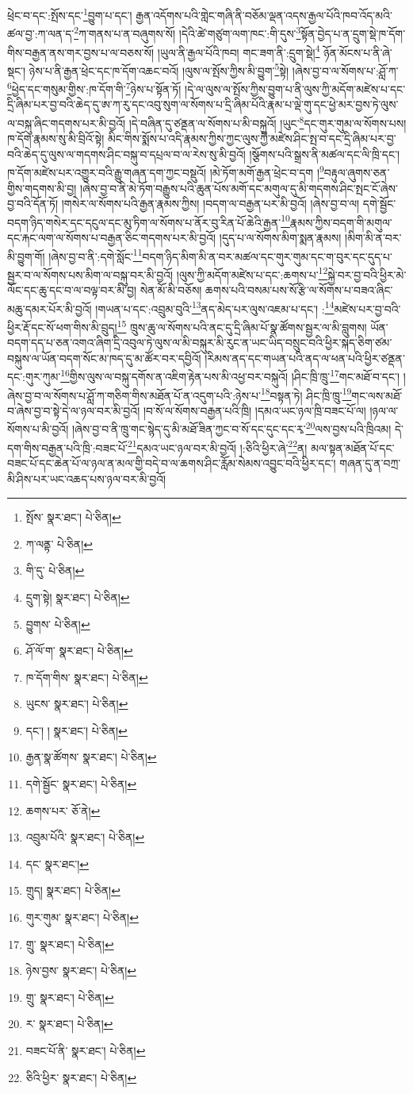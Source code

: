 ཕྲེང་བ་དང་:སྤོས་དང་\footnote{སྤོས་  སྣར་ཐང་།  པེ་ཅིན། }བྱུག་པ་དང་། རྒྱན་འདོགས་པའི་གླེང་གཞི་ནི་བཅོམ་ལྡན་འདས་རྒྱལ་པོའི་ཁབ་འོད་མའི་ཚལ་བྱ་:ཀ་ལན་ད་\footnote{ཀ་ལནྟ་  པེ་ཅིན། }ཀ་གནས་པ་ན་བཞུགས་སོ། །དེའི་ཚེ་གཙུག་ལག་ཁང་:གི་དུས་\footnote{གི་དུ་  པེ་ཅིན། }སྟོན་བྱེད་པ་ན་དྲུག་སྡེ་ཁ་དོག་གིས་བརྒྱན་ནས་གར་བྱས་པ་ལ་བཅས་སོ། །ཡུལ་ནི་རྒྱལ་པོའི་ཁབ། གང་ཟག་ནི་:དྲུག་སྡེ།\footnote{དྲུག་སྟེ།  སྣར་ཐང་།  པེ་ཅིན། } ཉོན་མོངས་པ་ནི་ཞེ་སྡང་། ཉེས་པ་ནི་རྒྱན་ཕྲེང་དང་ཁ་དོག་འཆང་བའོ། །ལུས་ལ་སྤོས་ཀྱིས་མི་བྱུག་\footnote{བྱུགས་  པེ་ཅིན། }སྟེ། །ཞེས་བྱ་བ་ལ་སོགས་པ་:ཤློ་ཀ་\footnote{ཤོ་ལོ་ག་  སྣར་ཐང་།  པེ་ཅིན། }ཕྱེད་དང་གསུམ་གྱིས་:ཁ་དོག་གི་\footnote{ཁ་དོག་གིས་  སྣར་ཐང་།  པེ་ཅིན། }ཉེས་པ་སྟོན་ཏོ། །དེ་ལ་ལུས་ལ་སྤོས་ཀྱིས་བྱུག་པ་ནི་ལུས་ཀྱི་མདོག་མཛེས་པ་དང་དྲི་ཞིམ་པར་བྱ་བའི་ཆེད་དུ་ཨ་ཀ་རུ་དང་འབུ་སུག་ལ་སོགས་པ་དྲི་ཞིམ་པོའི་རྣམ་པ་ལྡེ་གུ་དང་ཕྱེ་མར་བྱས་ཏེ་ལུས་ལ་བསྐུ་ཞིང་གདགས་པར་མི་བྱའོ། །དེ་བཞིན་དུ་ཙནྡན་ལ་སོགས་པ་མི་བསྐུའོ། །ཡུང་\footnote{ཡུངས་  སྣར་ཐང་།  པེ་ཅིན། }དང་གུར་གུམ་ལ་སོགས་པས། ཁ་དོག་རྣམས་སུ་མི་བྲིའོ་སྟེ། མིང་གིས་སྨོས་པ་འདི་རྣམས་ཀྱིས་ཀྱང་ལུས་ཀྱི་མཛེས་ཤིང་སྤ་བ་དང་དྲི་ཞིམ་པར་བྱ་བའི་ཆེད་དུ་ལུས་ལ་གདགས་ཤིང་བསྐུ་བ་དཔྲལ་བ་ལ་རེས་སུ་མི་བྱའོ། །སྩོགས་པའི་སྒྲས་ནི་མཚལ་དང་ལི་ཁྲི་དང་། ཁ་དོག་མཛེས་པར་འགྱུར་བའི་རྒྱུ་གཞན་དག་ཀྱང་བསྡུའོ། །མེ་ཏོག་མགོ་རྒྱན་ཕྲེང་བ་དག །\footnote{དང་། །  སྣར་ཐང་།  པེ་ཅིན། }བརྟུལ་ཞུགས་ཅན་གྱིས་གདགས་མི་བྱ། །ཞེས་བྱ་བ་ནི་མེ་ཏོག་བརྒྱུས་པའི་ཆུན་པོས་མགོ་དང་མགུལ་དུ་མི་གདགས་ཤིང་སྤང་ངོ་ཞེས་བྱ་བའི་དོན་ཏོ། །གསེར་ལ་སོགས་པའི་རྒྱན་རྣམས་ཀྱིས། །བདག་ལ་བརྒྱན་པར་མི་བྱའོ། །ཞེས་བྱ་བ་ལ། དགེ་སྦྱོང་བདག་ཉིད་གསེར་དང་དངུལ་དང་མུ་ཏིག་ལ་སོགས་པ་ནོར་བུ་རིན་པོ་ཆེའི་རྒྱན་\footnote{རྒྱན་སྣ་ཚོགས་  སྣར་ཐང་།  པེ་ཅིན། }རྣམས་ཀྱིས་བདག་གི་མགུལ་དང་རྐང་ལག་ལ་སོགས་པ་བརྒྱན་ཅིང་གདགས་པར་མི་བྱའོ། །དུད་པ་ལ་སོགས་མིག་སྨན་རྣམས། །མིག་མི་ན་བར་མི་བྱུག་གོ། །ཞེས་བྱ་བ་ནི་:དགེ་སློང་\footnote{དགེ་སྦྱོང་  སྣར་ཐང་།  པེ་ཅིན། }བདག་ཉིད་མིག་མི་ན་བར་མཚལ་དང་གུར་གུམ་དང་ག་བུར་དང་དུད་པ་སྦྱར་བ་ལ་སོགས་པས་མིག་ལ་བསྐུ་བར་མི་བྱའོ། །ལུས་ཀྱི་མདོག་མཛེས་པ་དང་:ཆགས་པ་\footnote{ཆགས་པར་  ཅོ་ནེ། }སྐྱེ་བར་བྱ་བའི་ཕྱིར་མེ་ལོང་དང་ཆུ་དང་བ་ལ་བལྟ་བར་མི་བྱ། སེན་མོ་མི་བཅོས། ཆགས་པའི་བསམ་པས་སོ་རྩི་ལ་སོགས་པ་བཟའ་ཞིང་མཆུ་དམར་པོར་མི་བྱའོ། །གཡན་པ་དང་:འབྲུམ་བུའི་\footnote{འབྲུམ་པོའི་  སྣར་ཐང་།  པེ་ཅིན། }ནད་མེད་པར་ལུས་འཇམ་པ་དང་། :\footnote{དང་  སྣར་ཐང་། }མཛེས་པར་བྱ་བའི་ཕྱིར་རྡོ་དང་སོ་ཕག་གིས་མི་བྲུད།\footnote{གྲུད།  སྣར་ཐང་།  པེ་ཅིན། } ཁྲུས་ཆུ་ལ་སོགས་པའི་ནང་དུ་དྲི་ཞིམ་པོ་སྣ་ཚོགས་སྦྱར་ལ་མི་བླུགས། ཡོན་བདག་དད་པ་ཅན་འགའ་ཞིག་དྲི་འབུལ་ཏེ་ལུས་ལ་མི་བསྐུར་མི་རུང་ན་ཡང་ཡིད་བསྲུང་བའི་ཕྱིར་སྐད་ཅིག་ཙམ་བསྐུས་ལ་ཡོན་བདག་སོང་མ་ཁད་དུ་མ་ཚོར་བར་དབྱིའོ། །རིམས་ནད་དང་གཡན་པའི་ནད་ལ་ཕན་པའི་ཕྱིར་ཙནྡན་དང་:གུར་ཀུམ་\footnote{གུར་གུམ་  སྣར་ཐང་།  པེ་ཅིན། }གྱིས་ལུས་ལ་བསྐུ་དགོས་ན་འཇིག་རྟེན་པས་མི་འཕྱ་བར་བསྐུའོ། །ཤིང་ཁྲི་ཁྲུ་\footnote{གྲུ་  སྣར་ཐང་།  པེ་ཅིན། }གང་མཐོ་བ་དང་། །ཞེས་བྱ་བ་ལ་སོགས་པ་ཤློ་ཀ་གཅིག་གིས་མཐོན་པོ་ན་འདུག་པའི་:ཉེས་པ་\footnote{ཉེས་བྱས་  སྣར་ཐང་།  པེ་ཅིན། }བསྟན་ཏེ། ཤིང་ཁྲི་ཁྲུ་\footnote{གྲུ་  སྣར་ཐང་།  པེ་ཅིན། }གང་ལས་མཐོ་བ་ཞེས་བྱ་བ་སྟེ་དེ་ལ་ཉལ་བར་མི་བྱའོ། །བ་སོ་ལ་སོགས་བརྒྱན་པའི་ཁྲི། །དམའ་ཡང་ཉལ་ཁྲི་བཟང་པོ་ལ། །ཉལ་ལ་སོགས་པ་མི་བྱའོ། །ཞེས་བྱ་བ་ནི་ཁྲུ་གང་སྙེད་དུ་མི་མཐོ་ཟིན་ཀྱང་བ་སོ་དང་དུང་དང་རྭ་\footnote{ར་  སྣར་ཐང་།  པེ་ཅིན། }ལས་བྱས་པའི་ཁྲིའམ། དེ་དག་གིས་བརྒྱན་པའི་ཁྲི་:བཟང་པོ་\footnote{བཟང་པོ་ནི་  སྣར་ཐང་།  པེ་ཅིན། }དམའ་ཡང་ཉལ་བར་མི་བྱའོ། །:ཅིའི་ཕྱིར་ཞེ་\footnote{ཅིའི་ཕྱིར་  སྣར་ཐང་།  པེ་ཅིན། }ན། མལ་སྟན་མཐོན་པོ་དང་བཟང་པོ་དང་ཆེན་པོ་ལ་ཉལ་ན་མལ་གྱི་བདེ་བ་ལ་ཆགས་ཤིང་རློམ་སེམས་འབྱུང་བའི་ཕྱིར་དང་། གཞན་དུ་ན་བཀྲ་མི་ཤིས་པར་ཡང་འཆད་པས་ཉལ་བར་མི་བྱའོ། 